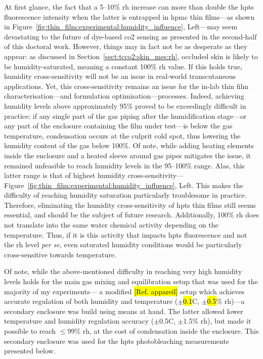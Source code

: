 At first glance, the fact that a 5--10\% \gls{rh} increase can more than double the \gls{hpts} fluorescence intensity when the latter is entrapped in \gls{hpmc} thin films---as shown in Figure~\ref{fig:thin_film:experimental:humidity_influence}, Left---may seem devastating to the future of dye-based \gls{co2} sensing as presented in the second-half of this doctoral work. However, things may in fact not be as desperate as they appear: as discussed in Section~\ref{sect:tcco2:skin_mes:rh}, occluded skin is likely to be humidity-saturated, meaning a constant 100\% \gls{rh} value. If this holds true, humidity cross-sensitivity will not be an issue in real-world transcutaneous applications. Yet, this cross-sensitivity remains an issue for the in-lab thin film characterisation---and formulation optimisation---processes. Indeed, achieving humidity levels above approximately 95\% proved to be exceedingly difficult in practice: if any single part of the gas piping after the humidification stage---or any part of the enclosure containing the film under test---is below the gas temperature, condensation occurs at the culprit cold spot, thus lowering the humidity content of the gas below 100\%. Of note, while adding heating elements inside the enclosure and a heated sleeve around gas pipes mitigates the issue, it remained unfeasible to reach humidity levels in the 95--100\% range. Alas, this latter range is that of highest humidity cross-sensitivity---Figure~\ref{fig:thin_film:experimental:humidity_influence}, Left. This makes the difficulty of reaching humidity saturation particularly troublesome in practice. \mfrin{}Therefore, eliminating the humidity cross-sensitivity of \gls{hpts} thin films still seems essential, and should be the subject of future research. Additionally, 100\% \gls{rh} does not translate into the same water chemical activity depending on the temperature\cite{huang2018}. Thus, if it is this activity that impacts \gls{hpts} fluorescence and not the \gls{rh} level \textit{per se}, even saturated humidity conditions would be particularly cross-sensitive towards temperature.

Of note, while the above-mentioned difficulty in reaching very high humidity levels holds for the main gas mixing and equilibration setup that was used for the majority of my experiments---\ie{} a modified \hl{[Ref. appareil]} setup which achieves accurate regulation of both humidity and temperature ($\pm$\hl{0.1}{\degree}C, $\pm$\hl{0.5}\% \gls{rh})---a secondary enclosure was build using means at hand. The latter allowed lower temperature and humidity regulation accuracy ($\pm$0.5{\degree}C, $\pm$1.5\% \gls{rh}), but made it possible to reach $\leq$99\% \gls{rh}, at the cost of condensation inside the enclosure. This secondary enclosure was used for the \gls{hpts} photobleaching measurements presented below.

